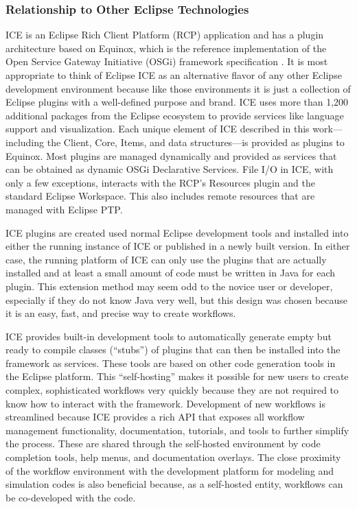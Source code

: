 \subsubsection{Relationship to Other Eclipse Technologies}\label{framework}

ICE is an Eclipse Rich Client Platform (RCP) application
\cite{mcaffer_eclipse_2010} and has a plugin architecture based on 
Equinox, which is the reference implementation of the Open Service Gateway Initiative (OSGi)
framework specification \cite{mcaffer_osgi_2010}. It is most appropriate to think of Eclipse ICE as an alternative flavor of any other Eclipse development environment because like those environments it is just a collection of Eclipse plugins with a well-defined purpose and brand. ICE uses more than 1,200 additional packages from the Eclipse ecosystem to provide services like language
support and visualization. Each unique element of ICE described
in this work---including the Client, Core, Items, and data structures---is 
provided as plugins to Equinox. Most plugins are managed
dynamically and provided as services that can be obtained as dynamic OSGi Declarative Services. File I/O in ICE, with only a few exceptions,
interacts with the RCP's Resources plugin and the standard Eclipse Workspace. This also includes remote resources that are managed with Eclipse PTP.

ICE plugins are created used normal Eclipse development tools and installed into either the running instance of ICE or published in a newly built version. In either case, the running platform of ICE can only use the plugins that are actually installed and at least a small amount of code must be written in Java for each plugin. This extension method may seem odd to the novice user or developer, especially if they do not know Java very well, but
this design was chosen because it is an easy, fast, and precise way to create workflows.

ICE provides built-in development tools to automatically generate empty but ready to compile classes (``stubs'') of plugins that can then be installed into the framework as services. These tools are based on other code generation tools in the Eclipse platform. This
``self-hosting'' makes it possible for new users to create complex,
sophisticated workflows very quickly because they are not required to
know how to interact with the framework. Development of new workflows is streamlined because ICE provides a
rich API that exposes all workflow management functionality, documentation, tutorials, and tools to further simplify the process. These are shared through the self-hosted environment by code completion tools, help menus, and documentation overlays. The close proximity of the workflow environment with the development platform for modeling and simulation codes is also beneficial because, as a self-hosted entity, workflows can be co-developed with the code.

